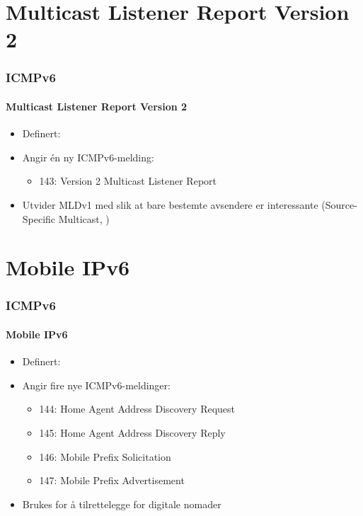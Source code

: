 \section{Multicast Listener Report Version 2}
\begin{frame}
  \frametitle{ICMPv6}
  \framesubtitle{Multicast Listener Report Version 2}
  \begin{itemize}
  \item Definert: 
  \item Angir én ny ICMPv6-melding:
    \begin{itemize}
    \item 143: Version 2 Multicast Listener Report
    \end{itemize}
  \item Utvider MLDv1  med slik at bare bestemte avsendere
    er interessante (Source-Specific Multicast, )
  \end{itemize}
\end{frame}

\section{Mobile IPv6}
\begin{frame}
  \frametitle{ICMPv6}
  \framesubtitle{Mobile IPv6}
  \begin{itemize}
  \item Definert: 
  \item Angir fire nye ICMPv6-meldinger:
    \begin{itemize}
    \item 144: Home Agent Address Discovery Request
    \item 145: Home Agent Address Discovery Reply
    \item 146: Mobile Prefix Solicitation
    \item 147: Mobile Prefix Advertisement
    \end{itemize}
  \item Brukes for å tilrettelegge for digitale nomader
  \end{itemize}
\end{frame}

